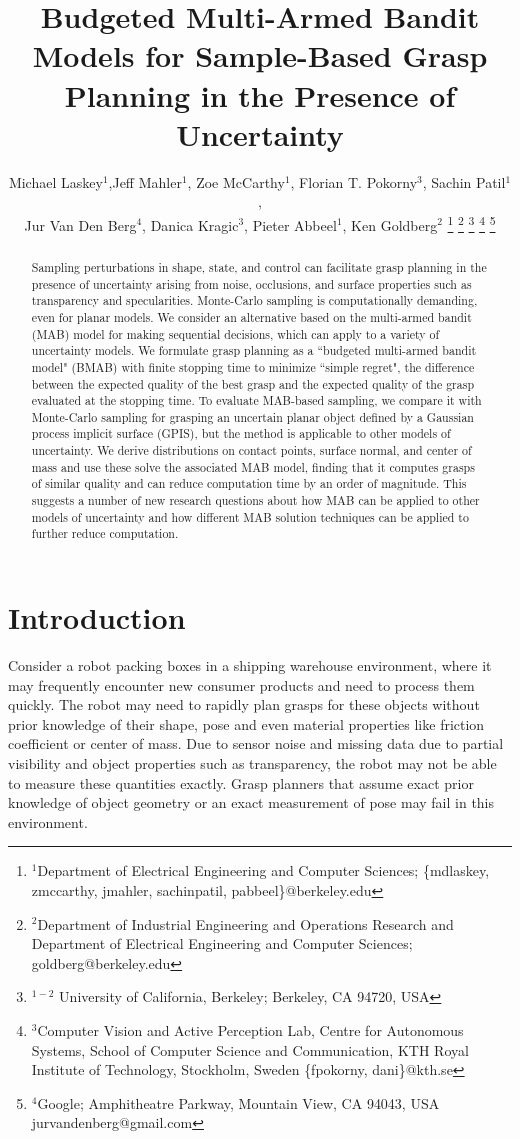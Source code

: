 \documentclass[letterpaper, 10 pt, conference]{ieeeconf}  %
\title{\LARGE \bf
Budgeted Multi-Armed Bandit Models for Sample-Based Grasp Planning in the Presence of Uncertainty}
\author{Michael Laskey$^1$,Jeff Mahler$^1$, Zoe McCarthy$^1$,  Florian T. Pokorny$^3$, Sachin Patil$^1$,\\ Jur Van Den Berg$^4$,  Danica Kragic$^3$, Pieter Abbeel$^1$, Ken Goldberg$^2$%
\thanks{$^1$Department of Electrical Engineering and Computer Sciences; {\small \{mdlaskey, zmccarthy, jmahler, sachinpatil, pabbeel\}@berkeley.edu}}%
\thanks{$^2$Department of Industrial Engineering and Operations Research and Department of Electrical Engineering and Computer Sciences; {\small goldberg@berkeley.edu}}%
\thanks{$^{1-2}$ University of California, Berkeley;  Berkeley, CA 94720, USA}%
\thanks{$^3$Computer Vision and Active Perception Lab, Centre for Autonomous Systems, School of Computer Science and Communication, KTH Royal Institute of Technology, Stockholm, Sweden {\small \{fpokorny, dani\}@kth.se}}%
\thanks{$^4$Google; Amphitheatre Parkway, Mountain View, CA 94043, USA {\small jurvandenberg@gmail.com}}%
}
\begin{document}
\maketitle
\thispagestyle{empty}
\pagestyle{empty}




\begin{abstract}
Sampling perturbations in shape, state, and control can facilitate grasp planning in the presence of uncertainty arising from noise, occlusions, and surface properties such as transparency and specularities.  Monte-Carlo sampling is computationally demanding, even for planar models. We consider an alternative based on the multi-armed bandit (MAB) model for making sequential decisions, which can apply to a variety of uncertainty models.  We formulate grasp planning as a ``budgeted multi-armed bandit model" (BMAB) with finite stopping time to minimize ``simple regret", the difference between the expected quality of the best grasp and the expected quality of the grasp evaluated at the stopping time.  To evaluate MAB-based sampling, we compare it with Monte-Carlo sampling for grasping an uncertain planar object defined by a Gaussian process implicit surface (GPIS), but the method is applicable to other models of uncertainty.  We derive distributions on contact points, surface normal, and center of mass and use these solve the associated MAB model, finding that it computes grasps of similar quality and can reduce computation time by an order of magnitude.  This suggests a number of new research questions about how MAB can be applied to other models of uncertainty and how different MAB solution techniques can be applied to further reduce computation.
\end{abstract}


\section{Introduction}



Consider a robot packing boxes in a shipping warehouse environment, where it may frequently encounter new consumer products and need to process them quickly.
The robot may need to rapidly plan grasps for these objects without prior knowledge of their shape, pose and even material properties like friction coefficient or center of mass.  Due to sensor noise and missing data due to partial visibility and object properties such as transparency, the robot may not be able to measure these quantities exactly.
Grasp planners that assume exact prior knowledge of object geometry or an exact measurement of pose may fail in this environment.
\end{document}
